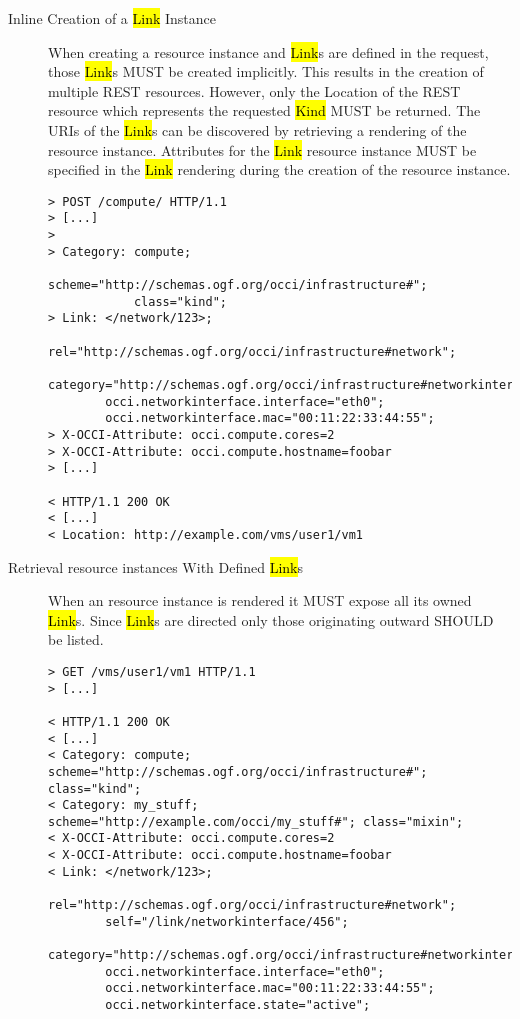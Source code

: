 \documentclass[10pt,a4paper]{article}
\begin{document}
\begin{description}
  \item[Inline Creation of a \hl{Link} Instance] When creating a
    resource instance and \hl{Link}s are defined in the request, those
    \hl{Link}s MUST be created implicitly. This results in the
    creation of multiple REST resources. However, only the Location of
    the REST resource which represents the requested \hl{Kind} MUST be
    returned. The URIs of the \hl{Link}s can be discovered by
    retrieving a rendering of the resource instance. Attributes for
    the \hl{Link} resource instance MUST be specified in the \hl{Link}
    rendering during the creation of the resource instance.

\begin{verbatim}
> POST /compute/ HTTP/1.1
> [...]
> 
> Category: compute; 
            scheme="http://schemas.ogf.org/occi/infrastructure#"; 
            class="kind"; 
> Link: </network/123>;
        rel="http://schemas.ogf.org/occi/infrastructure#network";
        category="http://schemas.ogf.org/occi/infrastructure#networkinterface";
        occi.networkinterface.interface="eth0";
        occi.networkinterface.mac="00:11:22:33:44:55";
> X-OCCI-Attribute: occi.compute.cores=2
> X-OCCI-Attribute: occi.compute.hostname=foobar
> [...]
 
< HTTP/1.1 200 OK
< [...]
< Location: http://example.com/vms/user1/vm1
\end{verbatim}

  \item[Retrieval resource instances With
    Defined \hl{Link}s] When an resource instance is rendered it 
    MUST expose all its owned \hl{Link}s. Since \hl{Link}s are
    directed only those originating outward SHOULD be listed.

\begin{verbatim}
> GET /vms/user1/vm1 HTTP/1.1
> [...]
 
< HTTP/1.1 200 OK
< [...]
< Category: compute; scheme="http://schemas.ogf.org/occi/infrastructure#"; class="kind";
< Category: my_stuff; scheme="http://example.com/occi/my_stuff#"; class="mixin";
< X-OCCI-Attribute: occi.compute.cores=2
< X-OCCI-Attribute: occi.compute.hostname=foobar
< Link: </network/123>;
        rel="http://schemas.ogf.org/occi/infrastructure#network";
        self="/link/networkinterface/456";
        category="http://schemas.ogf.org/occi/infrastructure#networkinterface";
        occi.networkinterface.interface="eth0";
        occi.networkinterface.mac="00:11:22:33:44:55";
        occi.networkinterface.state="active";
\end{verbatim}


\end{description}
\end{document}
